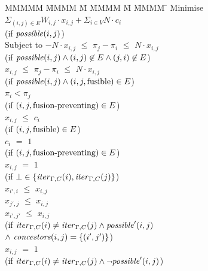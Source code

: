 \begin{figure}
\begin{tabbing}
MMMMM   \= MMMM \= M \= MMMM \= M \= MMMM \= \kill
Minimise   \> $\Sigma_{(i,j) \in E} W_{i,j} \cdot x_{i,j} + \Sigma_{i \in V} N \cdot c_i$  \\
           \> (if $\mathit{possible}(i,j)$)         
\\[0.5ex]
Subject to \> $-N \cdot x_{i,j}$ \> $\le$ \> $\pi_j - \pi_i$ \> $\le$ \> $N \cdot x_{i,j}$ \\
           \> (if $\mathit{possible}(i,j) \wedge (i,j) \not\in E \wedge (j,i) \not\in E$)            
\\[0.5ex]
           \>    $x_{i,j}$ \> $\le$ \> $\pi_j - \pi_i$ \> $\le$ \> $N \cdot x_{i,j}$ \\
           \> (if $\mathit{possible}(i,j) \wedge (i,j,\mathrm{fusible}) \in E$)     
\\[0.5ex]
           \>             \>       \> $\pi_i < \pi_j$ \>       \>            \\
           \> (if $(i,j,\mbox{fusion-preventing}) \in E$)    
\\[0.5ex]
           \> $x_{i,j}$    \> $\le$ \> $c_i$           \>       \>            \\
           \> (if $(i,j, \mathrm{fusible}) \in E$) \\
           \> $c_{i }$    \> $ = $ \> $ 1 $           \>       \>            \\
           \> (if $(i,j, \mbox{fusion-preventing}) \in E$)
\\[0.5ex]
           \> $x_{i,j}$    \> $=$   \> $1$             \>       \>            \\
           \> (if $\bot \in \{\mathit{iter}_{\Gamma,C}(i), \mathit{iter}_{\Gamma,C}(j)\}$)  
\\[0.5ex]
           \> $x_{i',i}$   \> $\le$ \> $x_{i,j}$        \>       \>            \\
           \> $x_{j',j}$   \> $\le$ \> $x_{i,j}$        \>       \>            \\
           \> $x_{i',j'}$   \> $\le$ \> $x_{i,j}$        \>       \>            \\
           \> (if $\mathit{iter}_{\Gamma,C}(i) \not= \mathit{iter}_{\Gamma,C}(j) \wedge \mathit{possible}'(i,j)$ \\
           \> \> $\wedge~\mathit{concestors}(i,j) = \{(i',j')\}$) 
\\[0.5ex]
           \> $x_{i,j}$    \> $=$   \> $1$             \>       \>            \\
           \> (if $\mathit{iter}_{\Gamma,C}(i) \not= \mathit{iter}_{\Gamma,C}(j) \wedge \neg \mathit{possible}'(i,j)$) 

\end{tabbing}
\end{figure}
